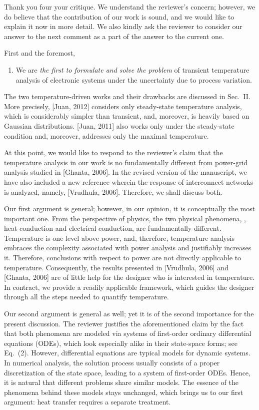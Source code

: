 \begin{authors}
Thank you four your critique.
We understand the reviewer's concern; however, we do believe that the contribution of our work is sound, and we would like to explain it now in more detail.
We also kindly ask the reviewer to consider our answer to the next comment as a part of the answer to the current one.

First and the foremost,
\begin{enumerate}
  \item We are \emph{the first to formulate and solve the problem} of transient temperature analysis of electronic systems under the uncertainty due to process variation.
\end{enumerate}
The two temperature-driven works and their drawbacks are discussed in Sec.~II.
More precisely, [Juan, 2012] considers only steady-state temperature analysis, which is considerably simpler than transient, and, moreover, is heavily based on Gaussian distributions.
[Juan, 2011] also works only under the steady-state condition and, moreover, addresses only the maximal temperature.

At this point, we would like to respond to the reviewer's claim that the temperature analysis in our work is no fundamentally different from power-grid analysis studied in [Ghanta, 2006].
In the revised version of the manuscript, we have also included a new reference wherein the response of interconnect networks is analyzed, namely, [Vrudhula, 2006].
Therefore, we shall discuss both.

Our first argument is general; however, in our opinion, it is conceptually the most important one.
From the perspective of physics, the two physical phenomena, \ie, heat conduction and electrical conduction, are fundamentally different.
Temperature is one level above power, and, therefore, temperature analysis embraces the complexity associated with power analysis and justifiably increases it.
Therefore, conclusions with respect to power are not directly applicable to temperature.
Consequently, the results presented in [Vrudhula, 2006] and [Ghanta, 2006] are of little help for the designer who is interested in temperature.
In contract, we provide a readily applicable framework, which guides the designer through all the steps needed to quantify temperature.

Our second argument is general as well; yet it is of the second importance for the present discussion.
The reviewer justifies the aforementioned claim by the fact that both phenomena are modeled via systems of first-order ordinary differential equations (ODEs), which look especially alike in their state-space forms; see Eq.~(2).
However, differential equations are typical models for dynamic systems.
In numerical analysis, the solution process usually consists of a proper discretization of the state space, leading to a system of first-order ODEs.
Hence, it is natural that different problems share similar models.
The essence of the phenomena behind these models stays unchanged, which brings us to our first argument: heat transfer requires a separate treatment.


\end{authors}
